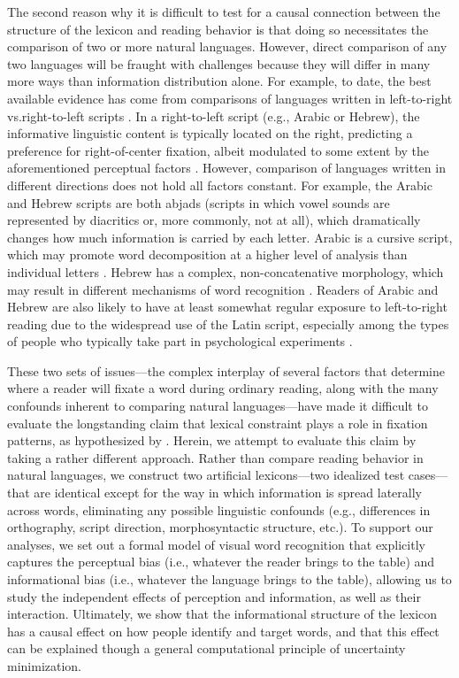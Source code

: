 \documentclass[doc,biblatex,floatsintext]{apa7}
\begin{document}
The second reason why it is difficult to test for a causal connection between the structure of the lexicon and reading behavior is that doing so necessitates the comparison of two or more natural languages. However, direct comparison of any two languages will be fraught with challenges because they will differ in many more ways than information distribution alone. For example, to date, the best available evidence has come from comparisons of languages written in left-to-right vs.\@ right-to-left scripts \parencite{Pollatsek:1981, Farid:1996, Deutsch:1999}. In a right-to-left script (e.g., Arabic or Hebrew), the informative linguistic content is typically located on the right, predicting a preference for right-of-center fixation, albeit modulated to some extent by the aforementioned perceptual factors \parencite{Nazir:2004, Brysbaert:2005}. However, comparison of languages written in different directions does not hold all factors constant. For example, the Arabic and Hebrew scripts are both abjads (scripts in which vowel sounds are represented by diacritics or, more commonly, not at all), which dramatically changes how much information is carried by each letter. Arabic is a cursive script, which may promote word decomposition at a higher level of analysis than individual letters \parencite{Farid:1996}. Hebrew has a complex, non-concatenative morphology, which may result in different mechanisms of word recognition \parencite{Velan:2011}. Readers of Arabic and Hebrew are also likely to have at least somewhat regular exposure to left-to-right reading due to the widespread use of the Latin script, especially among the types of people who typically take part in psychological experiments \parencite{Ducrot:2002, Sieroff:2015}.

These two sets of issues---the complex interplay of several factors that determine where a reader will fixate a word during ordinary reading, along with the many confounds inherent to comparing natural languages---have made it difficult to evaluate the longstanding claim that lexical constraint plays a role in fixation patterns, as hypothesized by \textcite[p.~298]{ORegan:1981}. Herein, we attempt to evaluate this claim by taking a rather different approach. Rather than compare reading behavior in natural languages, we construct two artificial lexicons---two idealized test cases---that are identical except for the way in which information is spread laterally across words, eliminating any possible linguistic confounds (e.g., differences in orthography, script direction, morphosyntactic structure, etc.). To support our analyses, we set out a formal model of visual word recognition that explicitly captures the perceptual bias (i.e., whatever the reader brings to the table) and informational bias (i.e., whatever the language brings to the table), allowing us to study the independent effects of perception and information, as well as their interaction. Ultimately, we show that the informational structure of the lexicon has a causal effect on how people identify and target words, and that this effect can be explained though a general computational principle of uncertainty minimization.
\end{document}
